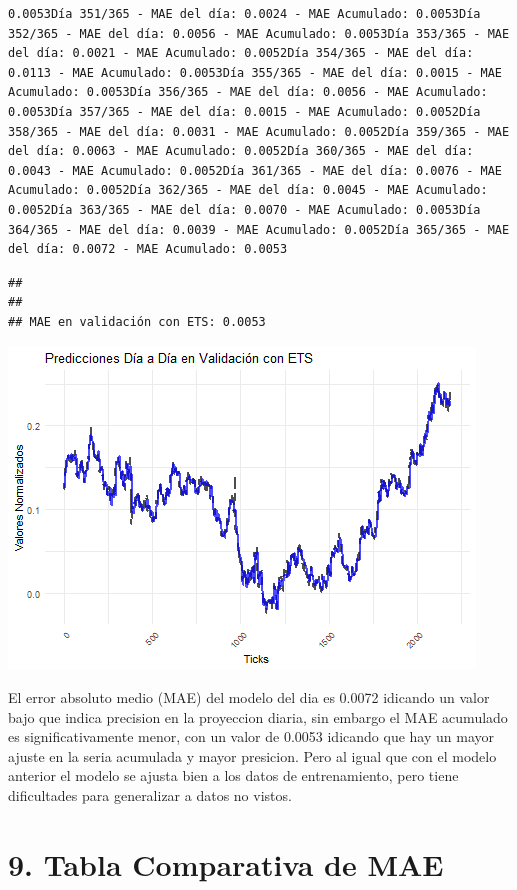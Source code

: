 \documentclass[
]{book}
\begin{document}
\begin{verbatim}
0.0053Día 351/365 - MAE del día: 0.0024 - MAE Acumulado: 0.0053Día 352/365 - MAE del día: 0.0056 - MAE Acumulado: 0.0053Día 353/365 - MAE del día: 0.0021 - MAE Acumulado: 0.0052Día 354/365 - MAE del día: 0.0113 - MAE Acumulado: 0.0053Día 355/365 - MAE del día: 0.0015 - MAE Acumulado: 0.0053Día 356/365 - MAE del día: 0.0056 - MAE Acumulado: 0.0053Día 357/365 - MAE del día: 0.0015 - MAE Acumulado: 0.0052Día 358/365 - MAE del día: 0.0031 - MAE Acumulado: 0.0052Día 359/365 - MAE del día: 0.0063 - MAE Acumulado: 0.0052Día 360/365 - MAE del día: 0.0043 - MAE Acumulado: 0.0052Día 361/365 - MAE del día: 0.0076 - MAE Acumulado: 0.0052Día 362/365 - MAE del día: 0.0045 - MAE Acumulado: 0.0052Día 363/365 - MAE del día: 0.0070 - MAE Acumulado: 0.0053Día 364/365 - MAE del día: 0.0039 - MAE Acumulado: 0.0052Día 365/365 - MAE del día: 0.0072 - MAE Acumulado: 0.0053
\end{verbatim}

\begin{verbatim}
## 
## 
## MAE en validación con ETS: 0.0053
\end{verbatim}

\includegraphics{bookdown_time_series_files/figure-latex/unnamed-chunk-18-1.png}

El error absoluto medio (MAE) del modelo del dia es 0.0072 idicando un valor bajo que indica precision en la proyeccion diaria, sin embargo el MAE acumulado es significativamente menor, con un valor de 0.0053 idicando que hay un mayor ajuste en la seria acumulada y mayor presicion. Pero al igual que con el modelo anterior el modelo se ajusta bien a los datos de entrenamiento, pero tiene dificultades para generalizar a datos no vistos.

\section{9. Tabla Comparativa de MAE}\label{tabla-comparativa-de-mae}
\end{document}
